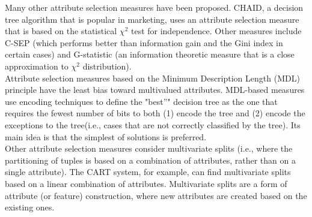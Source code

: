 Many other attribute selection measures have been proposed. CHAID, a decision tree algorithm that is popular
in marketing, uses an attribute selection measure that is based on the statistical $\chi^{2} $ test for independence. Other measures include C-SEP (which performs better than information gain and the Gini index in certain cases) and
G-statistic (an information theoretic measure that is a close approximation to $\chi^{2} $ distribution).\\
Attribute selection measures based on the Minimum Description Length (MDL) principle have the least bias
toward multivalued attributes. MDL-based measures use encoding techniques to define the "best”" decision tree
as the one that requires the fewest number of bits to both (1) encode the tree and (2) encode the exceptions to
the tree(i.e., cases that are not correctly classified by the tree). Its main idea is that the simplest of solutions is preferred. \\
Other attribute selection measures consider multivariate splits (i.e., where the partitioning of tuples is based
on a combination of attributes, rather than on a single attribute). The CART system, for example, can find
multivariate splits based on a linear combination of attributes. Multivariate splits are a form of attribute (or
feature) construction, where new attributes are created based on the existing ones.

